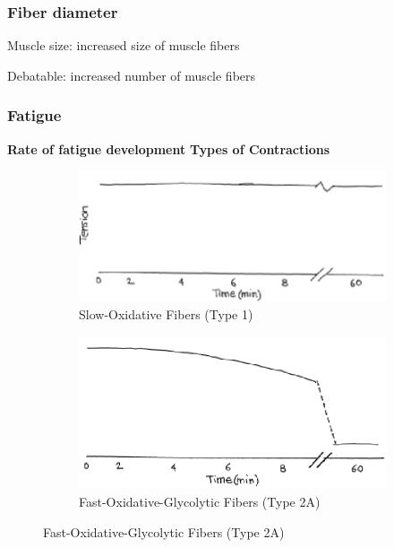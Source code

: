 \documentclass[11pt,fleqn]{book} %
\begin{document}
\subsubsection{Fiber diameter}
\begin{descriptions}
    \item[Muscle size: ]increased size of muscle fibers
    \item[Debatable: ]increased number of muscle fibers 
\end{descriptions}

\subsubsection{Fatigue}
\textbf{Rate of fatigue development}
\textbf{Types of Contractions}
\begin{figure}[h!]
    \centering
    \begin{subfigure}{0.45\textwidth}
        \includegraphics[width=\textwidth]{Pictures/Screenshot 2024-04-03 231435.png}
        \caption{Slow-Oxidative Fibers
(Type 1)}
    \end{subfigure}
    \hfill
    \begin{subfigure}{0.45\textwidth}
        \includegraphics[width=\textwidth]{Pictures/Screenshot 2024-04-03 231440.png}
        \caption{Fast-Oxidative-Glycolytic Fibers
(Type 2A)}
    \end{subfigure}

\end{figure}
\end{document}
